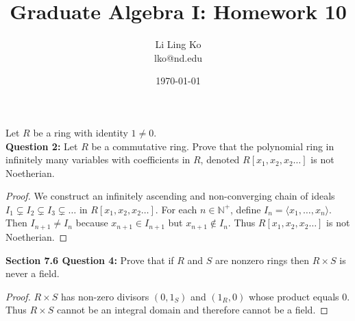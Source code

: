 \documentclass{article}
\begin{document}
\title{Graduate Algebra I: Homework 10}
\author{Li Ling Ko\\ lko@nd.edu}
\date{\today}
\maketitle

Let $R$ be a ring with identity $1\neq0$. \\

\textbf{Question 2:} Let $R$ be a commutative ring. Prove that the
  polynomial ring in infinitely many variables with coefficients in $R$,
  denoted $R[x_1,x_2,x_2\ldots]$ is not Noetherian.

  \begin{proof}
    We construct an infinitely ascending and non-converging chain of ideals
    $I_1\subsetneq I_2\subsetneq I_3\subsetneq\ldots$ in
    $R[x_1,x_2,x_2\ldots]$. For each $n\in\mathbb{N}^+$, define
    $I_n=\langle x_1,\ldots,x_n\rangle$. Then $I_{n+1}\neq I_n$ because
    $x_{n+1}\in I_{n+1}$ but $x_{n+1}\not\in I_{n}$. Thus
    $R[x_1,x_2,x_2\ldots]$ is not Noetherian.
  \end{proof}

\textbf{Section 7.6 Question 4:} Prove that if $R$ and $S$ are nonzero
  rings then $R\times S$ is never a field.
  \begin{proof}
    $R\times S$ has non-zero divisors $(0,1_S)$ and $(1_R,0)$ whose
    product equals 0. Thus $R\times S$ cannot be an integral domain and
    therefore cannot be a field.
  \end{proof}
\end{document}
